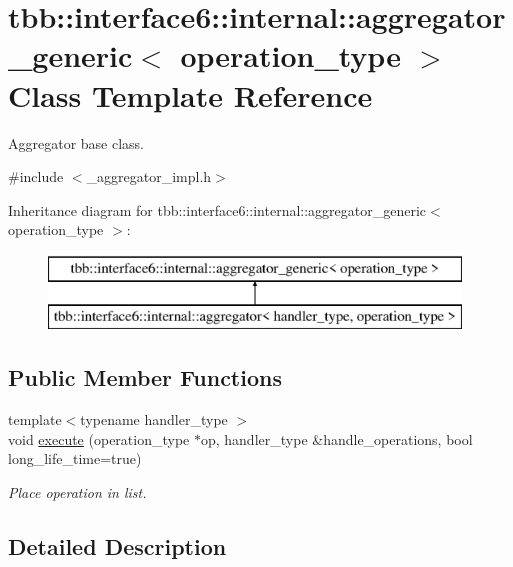 \hypertarget{classtbb_1_1interface6_1_1internal_1_1aggregator__generic}{}\section{tbb\+:\+:interface6\+:\+:internal\+:\+:aggregator\+\_\+generic$<$ operation\+\_\+type $>$ Class Template Reference}
\label{classtbb_1_1interface6_1_1internal_1_1aggregator__generic}


Aggregator base class.  




{\ttfamily \#include $<$\+\_\+aggregator\+\_\+impl.\+h$>$}

Inheritance diagram for tbb\+:\+:interface6\+:\+:internal\+:\+:aggregator\+\_\+generic$<$ operation\+\_\+type $>$\+:\begin{figure}[H]
\begin{center}
\leavevmode
\includegraphics[height=2.000000cm]{classtbb_1_1interface6_1_1internal_1_1aggregator__generic}
\end{center}
\end{figure}
\subsection*{Public Member Functions}
\begin{DoxyCompactItemize}
\item 
{\footnotesize template$<$typename handler\+\_\+type $>$ }\\void \hyperlink{classtbb_1_1interface6_1_1internal_1_1aggregator__generic_a4985caba10e390a7ee24ebc8a831a516}{execute} (operation\+\_\+type $\ast$op, handler\+\_\+type \&handle\+\_\+operations, bool long\+\_\+life\+\_\+time=true)
\begin{DoxyCompactList}\small\item\em Place operation in list. \end{DoxyCompactList}\end{DoxyCompactItemize}


\subsection{Detailed Description}
